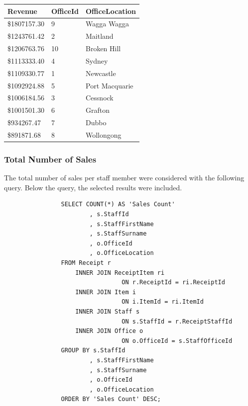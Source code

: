 \documentclass{article}
\begin{document}
            \begin{table}[H]
                \centering
                \begin{tabular}{|l|l|l|}
                \hline
                Revenue       & OfficeId & OfficeLocation \\ \hline
                \$1807157.30 & 9        & Wagga Wagga    \\ \hline
                \$1243761.42 & 2        & Maitland       \\ \hline
                \$1206763.76 & 10       & Broken Hill    \\ \hline
                \$1113333.40 & 4        & Sydney         \\ \hline
                \$1109330.77 & 1        & Newcastle      \\ \hline
                \$1092924.88 & 5        & Port Macquarie \\ \hline
                \$1006184.56 & 3        & Cessnock       \\ \hline
                \$1001501.30 & 6        & Grafton        \\ \hline
                \$934267.47  & 7        & Dubbo          \\ \hline
                \$891871.68  & 8        & Wollongong     \\ \hline
                \end{tabular}
            \end{table}

\newpage

            \subsubsection{Total Number of Sales}
                The total number of sales per staff member were considered with the following 
                query. Below the query, the selected results were included.
                \begin{lstlisting}
				SELECT COUNT(*) AS 'Sales Count'
						, s.StaffId
						, s.StaffFirstName
						, s.StaffSurname
						, o.OfficeId
						, o.OfficeLocation
				FROM Receipt r
					INNER JOIN ReceiptItem ri
								 ON r.ReceiptId = ri.ReceiptId
					INNER JOIN Item i
								 ON i.ItemId = ri.ItemId
					INNER JOIN Staff s
								 ON s.StaffId = r.ReceiptStaffId
					INNER JOIN Office o
								 ON o.OfficeId = s.StaffOfficeId
				GROUP BY s.StaffId
						, s.StaffFirstName
						, s.StaffSurname
						, o.OfficeId
						, o.OfficeLocation
				ORDER BY 'Sales Count' DESC;
                \end{lstlisting}
\end{document}
